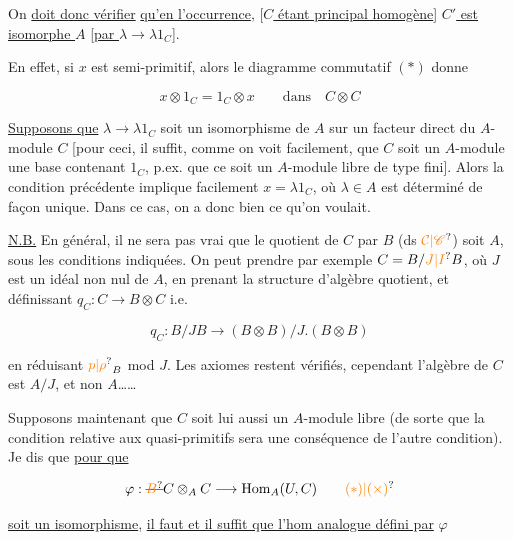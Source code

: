 On \uline{doit donc vérifier} \uline{qu'en l'occurrence},  [\uline{$C$ étant principal homogène}]  \uline{$C'$ est isomorphe  $A$} \uline{[par $\lambda\to\lambda1_C$]}.

En effet, si $x$ est semi-primitif, alors le diagramme commutatif $(*)$ donne

\[
x\otimes1_C=1_C\otimes x\qquad\text{dans}\quad C\otimes C
\]


\uline{Supposons que} $\lambda\to\lambda1_C$ soit un isomorphisme de $A$ sur un facteur direct du $A$-module $C$ [pour ceci, il suffit, comme on voit facilement, que $C$ soit un $A$-module   une base contenant $1_C$, p.ex. que ce soit un $A$-module libre de type fini]. Alors la condition précédente implique facilement $x=\lambda1_C$, où $\lambda\in A$ est déterminé de façon unique. Dans ce cas, on a donc bien ce qu'on voulait.

\uline{N.B.} En général,  il ne sera pas vrai que le quotient de $C$ par $B$ (ds $\unsure{\mathcal{C}|\mathscr{C}}$) soit $A$, sous les conditions indiquées. On peut prendre par exemple $C=B/\unsure{J|I}B$, où $J$ est un idéal non nul de $A$,   en prenant la structure d'algèbre quotient, et définissant $q_C:C\to B\otimes C$ i.e.

\[
q_C:B/JB\longrightarrow (B\otimes B)/J.(B\otimes B)
\]

en réduisant $\unsure{p|\rho}_B$ mod $J$. Les axiomes restent vérifiés, cependant l'algèbre  de $C$ est $A/J$, et non $A$\ldots\ldots
{}


Supposons maintenant que $C$ soit lui aussi un $A$-module libre (de sorte que la condition relative aux quasi-primitifs sera une conséquence de l'autre condition). Je dis que \uline{pour que} \deleted{$\varphi$}

\[
\varphi:\deleted{\unsure{B}}C\otimes_A C\longrightarrow\operatorname{Hom}_A(U,C)\tag*{\unsure{$(*)$|$(\times)$}}
\]

\uline{soit un isomorphisme}, \uline{il faut et il suffit que l'hom analogue défini par} $\varphi$

